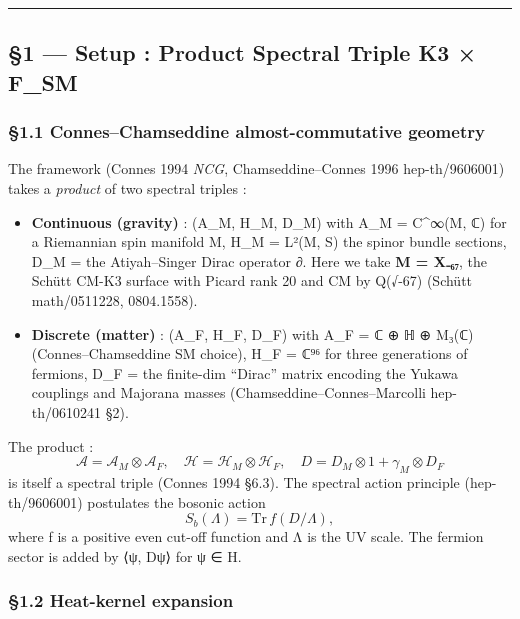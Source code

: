 \documentclass[
  11pt,
  a4paper,
]{article}
\begin{document}
\begin{center}\rule{0.5\linewidth}{0.5pt}\end{center}

\hypertarget{setup-product-spectral-triple-k3-f_sm}{%
\subsection{§1 --- Setup : Product Spectral Triple K3 × F\_SM}\label{setup-product-spectral-triple-k3-f_sm}}

\hypertarget{conneschamseddine-almost-commutative-geometry}{%
\subsubsection{§1.1 Connes--Chamseddine almost-commutative geometry}\label{conneschamseddine-almost-commutative-geometry}}

The framework (Connes 1994 \emph{NCG}, Chamseddine--Connes 1996 hep-th/9606001) takes a \emph{product} of two spectral triples :

\begin{itemize}
\item
  \textbf{Continuous (gravity)} : (A\_M, H\_M, D\_M) with A\_M = C\^{}∞(M, ℂ) for a Riemannian spin manifold M, H\_M = L²(M, S) the spinor bundle sections, D\_M = the Atiyah--Singer Dirac operator ∂. Here we take \textbf{M = X₋₆₇}, the Schütt CM-K3 surface with Picard rank 20 and CM by Q(√-67) (Schütt math/0511228, 0804.1558).
\item
  \textbf{Discrete (matter)} : (A\_F, H\_F, D\_F) with A\_F = ℂ ⊕ ℍ ⊕ M₃(ℂ) (Connes--Chamseddine SM choice), H\_F = ℂ⁹⁶ for three generations of fermions, D\_F = the finite-dim ``Dirac'' matrix encoding the Yukawa couplings and Majorana masses (Chamseddine--Connes--Marcolli hep-th/0610241 §2).
\end{itemize}

The product :
\[
\mathcal{A} = \mathcal{A}_M \otimes \mathcal{A}_F,\quad
\mathcal{H} = \mathcal{H}_M \otimes \mathcal{H}_F,\quad
D = D_M \otimes 1 + \gamma_M \otimes D_F
\]
is itself a spectral triple (Connes 1994 §6.3). The spectral action principle (hep-th/9606001) postulates the bosonic action
\[
S_b(\Lambda) = \mathrm{Tr}\, f(D/\Lambda),
\]
where f is a positive even cut-off function and Λ is the UV scale. The fermion sector is added by ⟨ψ, Dψ⟩ for ψ ∈ H.

\hypertarget{heat-kernel-expansion}{%
\subsubsection{§1.2 Heat-kernel expansion}\label{heat-kernel-expansion}}
\end{document}
